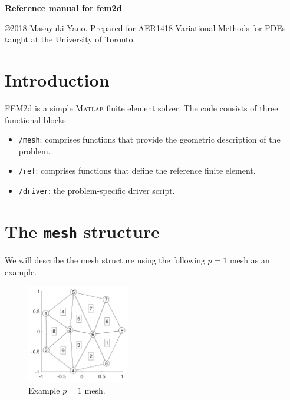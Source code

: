 \documentclass[openany,preprint,11pt]{article}
\newcommand{\disclaimer}{\copyright2018 Masayuki Yano.  Prepared for AER1418 Variational Methods for PDEs taught at the University of Toronto.}
\begin{document}
\begin{center}
  \begin{LARGE}
    \textbf{Reference manual for fem2d}
  \end{LARGE}
\end{center}

\noindent\disclaimer
\section{Introduction}
FEM2d is a simple \textsc{Matlab} finite element solver.  The code consists of three functional blocks:
\begin{itemize}
\item \texttt{/mesh}: comprises functions that provide the geometric description of the problem. 
\item \texttt{/ref}: comprises functions that define the reference finite element.
\item \texttt{/driver}: the problem-specific driver script.
\end{itemize}
\section{The \texttt{mesh} structure}
We will describe the mesh structure using the following $p=1$ mesh as an example.
\begin{figure}[!h]
  \centering
  \includegraphics[width=0.4\textwidth]{mesh_p1}
  \caption{Example $p=1$ mesh.}
\end{figure}
\end{document}
